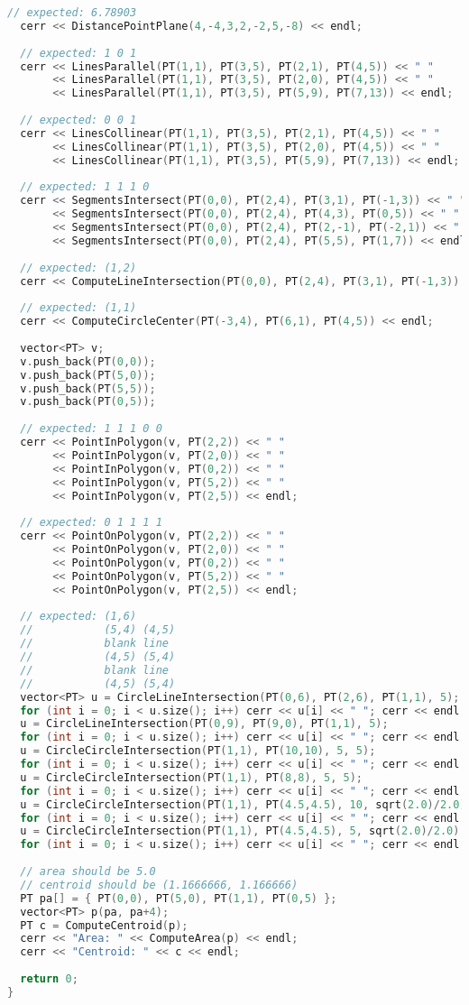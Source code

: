\begin{lstlisting}[language=C++]
  // expected: 6.78903
  cerr << DistancePointPlane(4,-4,3,2,-2,5,-8) << endl;
  
  // expected: 1 0 1
  cerr << LinesParallel(PT(1,1), PT(3,5), PT(2,1), PT(4,5)) << " "
       << LinesParallel(PT(1,1), PT(3,5), PT(2,0), PT(4,5)) << " "
       << LinesParallel(PT(1,1), PT(3,5), PT(5,9), PT(7,13)) << endl;
  
  // expected: 0 0 1
  cerr << LinesCollinear(PT(1,1), PT(3,5), PT(2,1), PT(4,5)) << " "
       << LinesCollinear(PT(1,1), PT(3,5), PT(2,0), PT(4,5)) << " "
       << LinesCollinear(PT(1,1), PT(3,5), PT(5,9), PT(7,13)) << endl;
  
  // expected: 1 1 1 0
  cerr << SegmentsIntersect(PT(0,0), PT(2,4), PT(3,1), PT(-1,3)) << " "
       << SegmentsIntersect(PT(0,0), PT(2,4), PT(4,3), PT(0,5)) << " "
       << SegmentsIntersect(PT(0,0), PT(2,4), PT(2,-1), PT(-2,1)) << " "
       << SegmentsIntersect(PT(0,0), PT(2,4), PT(5,5), PT(1,7)) << endl;
  
  // expected: (1,2)
  cerr << ComputeLineIntersection(PT(0,0), PT(2,4), PT(3,1), PT(-1,3)) << endl;
  
  // expected: (1,1)
  cerr << ComputeCircleCenter(PT(-3,4), PT(6,1), PT(4,5)) << endl;
  
  vector<PT> v; 
  v.push_back(PT(0,0));
  v.push_back(PT(5,0));
  v.push_back(PT(5,5));
  v.push_back(PT(0,5));
  
  // expected: 1 1 1 0 0
  cerr << PointInPolygon(v, PT(2,2)) << " "
       << PointInPolygon(v, PT(2,0)) << " "
       << PointInPolygon(v, PT(0,2)) << " "
       << PointInPolygon(v, PT(5,2)) << " "
       << PointInPolygon(v, PT(2,5)) << endl;
  
  // expected: 0 1 1 1 1
  cerr << PointOnPolygon(v, PT(2,2)) << " "
       << PointOnPolygon(v, PT(2,0)) << " "
       << PointOnPolygon(v, PT(0,2)) << " "
       << PointOnPolygon(v, PT(5,2)) << " "
       << PointOnPolygon(v, PT(2,5)) << endl;
  
  // expected: (1,6)
  //           (5,4) (4,5)
  //           blank line
  //           (4,5) (5,4)
  //           blank line
  //           (4,5) (5,4)
  vector<PT> u = CircleLineIntersection(PT(0,6), PT(2,6), PT(1,1), 5);
  for (int i = 0; i < u.size(); i++) cerr << u[i] << " "; cerr << endl;
  u = CircleLineIntersection(PT(0,9), PT(9,0), PT(1,1), 5);
  for (int i = 0; i < u.size(); i++) cerr << u[i] << " "; cerr << endl;
  u = CircleCircleIntersection(PT(1,1), PT(10,10), 5, 5);
  for (int i = 0; i < u.size(); i++) cerr << u[i] << " "; cerr << endl;
  u = CircleCircleIntersection(PT(1,1), PT(8,8), 5, 5);
  for (int i = 0; i < u.size(); i++) cerr << u[i] << " "; cerr << endl;
  u = CircleCircleIntersection(PT(1,1), PT(4.5,4.5), 10, sqrt(2.0)/2.0);
  for (int i = 0; i < u.size(); i++) cerr << u[i] << " "; cerr << endl;
  u = CircleCircleIntersection(PT(1,1), PT(4.5,4.5), 5, sqrt(2.0)/2.0);
  for (int i = 0; i < u.size(); i++) cerr << u[i] << " "; cerr << endl;
  
  // area should be 5.0
  // centroid should be (1.1666666, 1.166666)
  PT pa[] = { PT(0,0), PT(5,0), PT(1,1), PT(0,5) };
  vector<PT> p(pa, pa+4);
  PT c = ComputeCentroid(p);
  cerr << "Area: " << ComputeArea(p) << endl;
  cerr << "Centroid: " << c << endl;
  
  return 0;
}
\end{lstlisting}